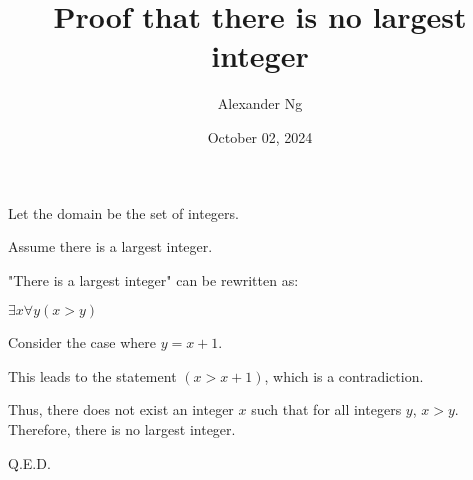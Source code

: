 \documentclass[12pt]{article}
\begin{document}
\title{Proof that there is no largest integer}
\author{Alexander Ng}
\date{October 02, 2024}

\maketitle

Let the domain be the set of integers.

Assume there is a largest integer.

"There is a largest integer" can be rewritten as:

$\exists x \forall y (x > y)$

Consider the case where $y = x + 1$. 

This leads to the statement $(x > x + 1)$, which is a contradiction.

Thus, there does not exist an integer $x$ such that for all integers $y$,
$x > y$. Therefore, there is no largest integer.

Q.E.D.
\end{document}
